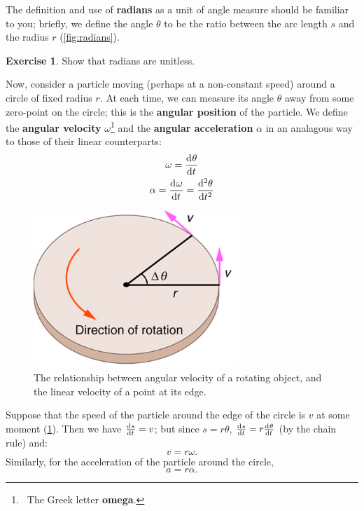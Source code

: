 \documentclass[a4paper]{amsbook}
\theoremstyle{definition}
\newtheorem{exercise}{Exercise}
\numberwithin{exercise}{chapter}
\numberwithin{exercise}{chapter}
\begin{document}
The definition and use of \textbf{radians} as a unit of angle measure should be familiar to you; briefly, we define the
angle $ \theta $ to be the ratio between the arc length $ s $ and the radius $ r $ (\cref{fig:radians}).

\begin{exercise}
  Show that radians are unitless.
\end{exercise}

Now, consider a particle moving (perhaps at a non-constant speed) around a circle of fixed radius $ r $. At each time, we can measure
its angle $ \theta $ away from some zero-point on the circle; this is the \textbf{angular position} of the particle. We define the
\textbf{angular velocity} $ \omega $\footnote{~The Greek letter \textbf{omega}.} and the \textbf{angular acceleration} $ \alpha $
in an analagous way to those of their linear counterparts:
\begin{gather}
  \omega = \dod{\theta}{t}\\
  \alpha = \dod{\omega}{t} = \dod[2]{\theta}{t}
\end{gather}

\begin{figure}
  \centering
  \includegraphics[width=0.7\textwidth]{angvelocity}
  \caption{The relationship between angular velocity of a rotating object, and the linear velocity of a point at its edge.\label{fig:angvelocity}}
\end{figure}

Suppose that the speed of the particle around the edge of the circle is $ v $ at some moment (\cref{fig:angvelocity}). Then we have $ \od{s}{t} = v $;
but since $ s = r\theta $, $ \od{s}{t} = r\od{\theta}{t} $ (by the chain rule) and:
\begin{equation}
  v = r\omega.
\end{equation}
Similarly, for the acceleration of the particle around the circle,
\begin{equation}
  a = r\alpha.
\end{equation}
\end{document}
